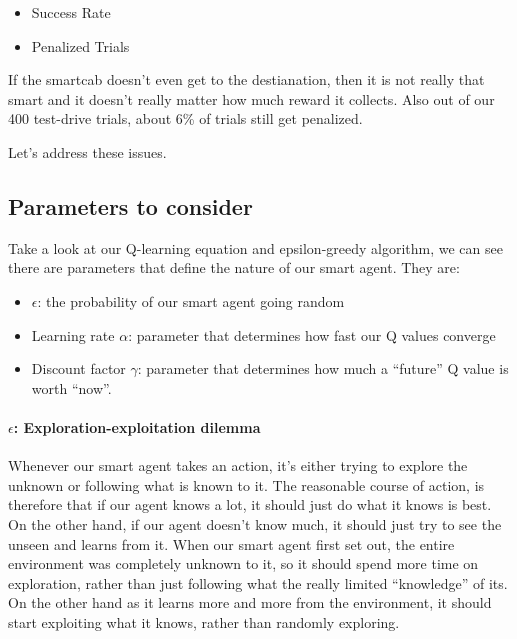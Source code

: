 \documentclass{article}
\providecommand{\tightlist}{%
      \setlength{\itemsep}{0pt}\setlength{\parskip}{0pt}}
\begin{document}
\begin{itemize}
\tightlist
\item
  Success Rate
\item
  Penalized Trials
\end{itemize}

If the smartcab doesn't even get to the destianation, then it is not
really that smart and it doesn't really matter how much reward it
collects. Also out of our 400 test-drive trials, about 6\% of trials
still get penalized.

Let's address these issues.

\subsection{Parameters to consider}\label{parameters-to-consider}

Take a look at our Q-learning equation and epsilon-greedy algorithm, we
can see there are parameters that define the nature of our smart agent.
They are:

\begin{itemize}
\tightlist
\item
  \(\epsilon\): the probability of our smart agent going random
\item
  Learning rate \(\alpha\): parameter that determines how fast our Q
  values converge
\item
  Discount factor \(\gamma\): parameter that determines how much a
  ``future'' Q value is worth ``now''.
\end{itemize}

\paragraph{\texorpdfstring{\(\epsilon\): Exploration-exploitation
dilemma}{\textbackslash{}epsilon: Exploration-exploitation dilemma}}\label{epsilon-exploration-exploitation-dilemma}

Whenever our smart agent takes an action, it's either trying to explore
the unknown or following what is known to it. The reasonable course of
action, is therefore that if our agent knows a lot, it should just do
what it knows is best. On the other hand, if our agent doesn't know
much, it should just try to see the unseen and learns from it. When our
smart agent first set out, the entire environment was completely unknown
to it, so it should spend more time on exploration, rather than just
following what the really limited ``knowledge'' of its. On the other
hand as it learns more and more from the environment, it should start
exploiting what it knows, rather than randomly exploring.
\end{document}
